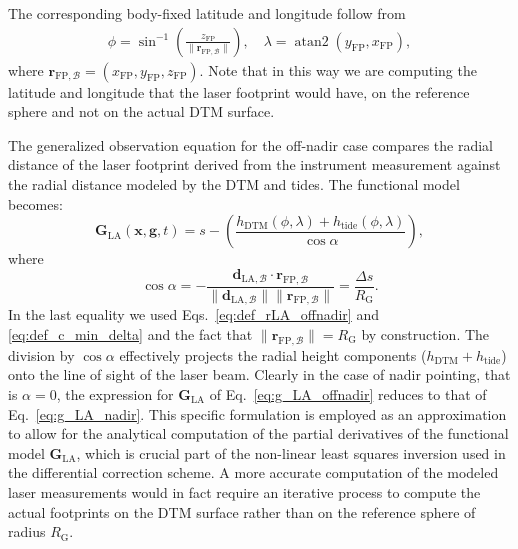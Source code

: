\documentclass[pdflatex,sn-mathphys-num]{sn-jnl}%
\theoremstyle{thmstyleone}%
\theoremstyle{thmstyletwo}%
\theoremstyle{thmstylethree}%
\DeclareMathOperator{\atantwo}{atan2}
\renewcommand{\vec}[1]{\boldsymbol{#1}}
\begin{document}
%
The corresponding body-fixed latitude and longitude follow from
\begin{align}
	\phi = \sin^{-1}\!\left(\frac{z_{\mathrm{FP}}}{\| \vec{r}_{\mathrm{FP},\mathcal{B}}\| }\right),
	\quad
	\lambda = \atantwo\!\left(y_{\mathrm{FP}}, x_{\mathrm{FP}}\right),
\end{align}
where $\vec{r}_{\mathrm{FP},\mathcal{B}} = (x_{\mathrm{FP}}, y_{\mathrm{FP}}, z_{\mathrm{FP}})$.
%
Note that in this way we are computing the latitude and longitude that the laser footprint would have, on the reference sphere and not on the actual DTM surface.

The generalized observation equation for the off-nadir case compares the radial distance of the laser footprint derived from the instrument measurement against the radial distance modeled by the DTM and tides. The functional model becomes:
\begin{equation}
    \vec{G}_{\mathrm{LA}}(\vec{x},\vec{g},t) = s -
    \left( \frac{ h_{\mathrm{DTM}}(\phi, \lambda) 
	+  h_{\mathrm{tide}}(\phi, \lambda)}{\cos \alpha }\right),
    \label{eq:g_LA_offnadir}
\end{equation}
where 
\begin{equation}
	\cos \alpha = -
	\frac{\vec{d}_{\mathrm{LA},\mathcal{B}} \cdot \vec{r}_{\mathrm{FP},\mathcal{B}}}{\|\vec{d}_{\mathrm{LA},\mathcal{B}} \| \| \vec{r}_{\mathrm{FP},\mathcal{B}}\|}
	=
	\frac{\Delta s}{R_{\mathrm{G}}}.
\end{equation}
In the last equality we used Eqs.~\eqref{eq:def_rLA_offnadir} and \eqref{eq:def_c_min_delta} and the fact that ${\| \vec{r}_{\mathrm{FP},\mathcal{B}}\| = R_{\mathrm{G}} }$ by construction.
The division by $\cos \alpha$ effectively projects the radial height components ($h_{\mathrm{DTM}} + h_{\mathrm{tide}}$) onto the line of sight of the laser beam.
%
Clearly in the case of nadir pointing, that is ${\alpha = 0}$, the expression for $\vec{G}_{\mathrm{LA}}$ of Eq.~\eqref{eq:g_LA_offnadir} reduces to that of Eq.~\eqref{eq:g_LA_nadir}.
%
This specific formulation is employed as an approximation to allow for the analytical computation of the partial derivatives of the functional model $\vec{G}_{\mathrm{LA}}$, which is crucial part of the non-linear least squares inversion used in the differential correction scheme.
A more accurate computation of the modeled laser measurements would in fact require an iterative process to compute the actual footprints on the DTM surface rather than on the reference sphere of radius $R_{\mathrm{G}}$.
\end{document}
